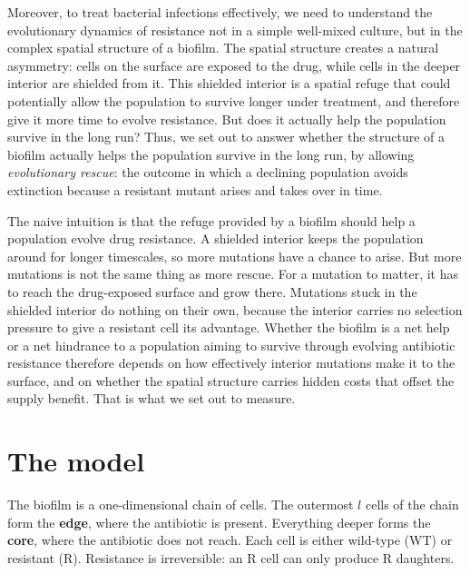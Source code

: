 \documentclass[11pt]{article}
\begin{document}
Moreover, to treat bacterial infections effectively, we need to understand the evolutionary dynamics of resistance not in a simple well-mixed culture, but in the complex spatial structure of a biofilm. The spatial structure creates a natural asymmetry: cells on the surface are exposed to the drug, while cells in the deeper interior are shielded from it. This shielded interior is a spatial refuge that could potentially allow the population to survive longer under treatment, and therefore give it more time to evolve resistance. But does it actually help the population survive in the long run? Thus, we set out to answer whether the structure of a biofilm actually helps the population survive in the long run, by allowing \emph{evolutionary rescue}: the outcome in which a declining population avoids extinction because a resistant mutant arises and takes over in time.

The naive intuition is that the refuge provided by a biofilm should help a population evolve drug resistance. A shielded interior keeps the population around for longer timescales, so more mutations have a chance to arise. But more mutations is not the same thing as more rescue. For a mutation to matter, it has to reach the drug-exposed surface and grow there. Mutations stuck in the shielded interior do nothing on their own, because the interior carries no selection pressure to give a resistant cell its advantage. Whether the biofilm is a net help or a net hindrance to a population aiming to survive through evolving antibiotic resistance therefore depends on how effectively interior mutations make it to the surface, and on whether the spatial structure carries hidden costs that offset the supply benefit. That is what we set out to measure.



\section{The model}
\label{sec:model}

The biofilm is a one-dimensional chain of cells. The outermost $l$ cells of the chain form the \textbf{edge}, where the antibiotic is
present. Everything deeper forms the \textbf{core}, where the
antibiotic does not reach. Each cell is either wild-type (WT) or
resistant (R). Resistance is irreversible: an R cell can only
produce R daughters.
\end{document}
